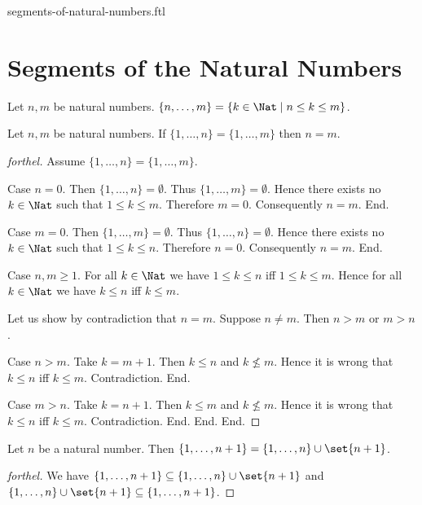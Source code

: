 \documentclass{naproche-library}
\begin{document}
\begin{smodule}{segments-of-natural-numbers.ftl}

  \section*{Segments of the Natural Numbers}

  \begin{definition}[forthel,id=FOUNDATIONS_14_3625613501923328,printid]
    Let $n, m$ be natural numbers.
    $\{ n, \dots, m \} = \{ k \in \Nat \mid n \leq k \leq m \}$.
  \end{definition}

  \begin{proposition}[forthel,id=FOUNDATIONS_14_145331933151232,printid]
    Let $n, m$ be natural numbers.
    If $\{ 1, \dots, n \} = \{ 1, \dots, m \}$ then $n = m$.
  \end{proposition}
  \begin{proof}[forthel]
    Assume $\{ 1, \dots, n \} = \{ 1, \dots, m \}$.

    Case $n = 0$.
      Then $\{ 1, \dots, n \} = \emptyset$.
      Thus $\{ 1, \dots, m \} = \emptyset$.
      Hence there exists no $k \in \Nat$ such that $1 \leq k \leq m$.
      Therefore $m = 0$.
      Consequently $n = m$.
    End.

    Case $m = 0$.
      Then $\{ 1, \dots, m \} = \emptyset$.
      Thus $\{ 1, \dots, n \} = \emptyset$.
      Hence there exists no $k \in \Nat$ such that $1 \leq k \leq n$.
      Therefore $n = 0$.
      Consequently $n = m$.
    End.

    Case $n, m \geq 1$.
      For all $k \in \Nat$ we have $1 \leq k \leq n$ iff $1 \leq k \leq m$.
      Hence for all $k \in \Nat$ we have $k \leq n$ iff $k \leq m$.

      Let us show by contradiction that $n = m$.
        Suppose $n \neq m$.
        Then $n > m$ or $m > n$.

        Case $n > m$.
          Take $k = m + 1$.
          Then $k \leq n$ and $k \nleq m$.
          Hence it is wrong that $k \leq n$ iff $k \leq m$.
          Contradiction.
        End.

        Case $m > n$.
          Take $k = n + 1$.
          Then $k \leq m$ and $k \nleq m$.
          Hence it is wrong that $k \leq n$ iff $k \leq m$.
          Contradiction.
        End.
      End.
    End.
  \end{proof}

  \begin{proposition}[forthel,id=FOUNDATIONS_14_658708738605056,printid]
    Let $n$ be a natural number.
    Then $\{ 1, \dots, n + 1 \} = \{ 1, \dots, n \} \cup \set{n + 1}$.
  \end{proposition}
  \begin{proof}[forthel]
    We have
    $\{ 1, \dots, n + 1 \} \subseteq \{ 1, \dots, n \} \cup \set{n + 1}$ and $\{ 1, \dots, n \} \cup \set{n + 1} \subseteq \{ 1, \dots, n + 1 \}$.
  \end{proof}
\end{smodule}
\end{document}
